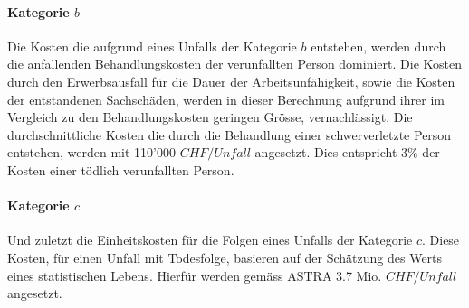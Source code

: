 \paragraph{Kategorie $b$} Die Kosten die aufgrund eines Unfalls der Kategorie $b$ entstehen, werden durch die anfallenden Behandlungskosten der verunfallten Person dominiert. Die Kosten durch den Erwerbsausfall für die Dauer der Arbeitsunfähigkeit, sowie die Kosten der entstandenen Sachschäden, werden in dieser Berechnung aufgrund ihrer im Vergleich zu den Behandlungskosten geringen Grösse, vernachlässigt. Die durchschnittliche Kosten die durch die Behandlung einer schwerverletzte Person entstehen, werden mit 110'000 $CHF/Unfall$ angesetzt. Dies entspricht 3\% der Kosten einer tödlich verunfallten Person.

\paragraph{Kategorie $c$} Und zuletzt die Einheitskosten für die Folgen eines Unfalls der Kategorie $c$. Diese Kosten, für einen Unfall mit Todesfolge, basieren auf der Schätzung des Werts eines statistischen Lebens. Hierfür werden gemäss ASTRA 3.7 Mio. $CHF/Unfall$ angesetzt.



\newpage




%

